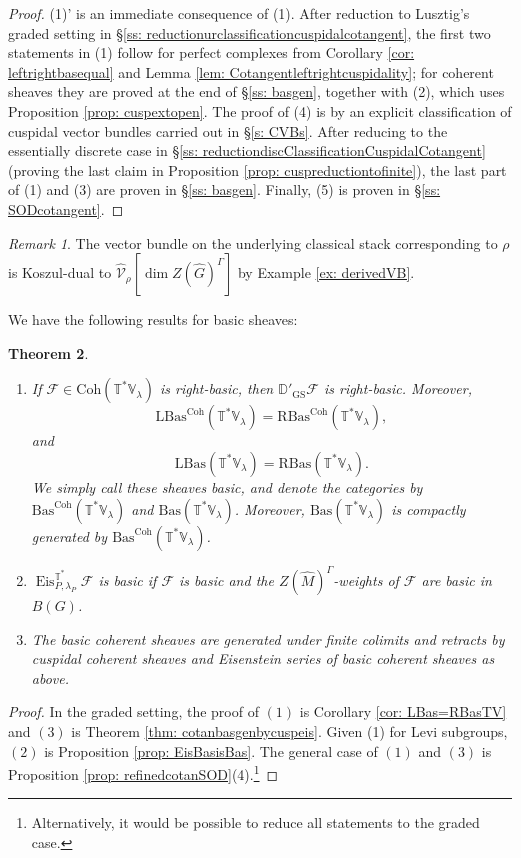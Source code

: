 \documentclass{amsart}
\newtheorem{theorem}{Theorem}[subsection]
\theoremstyle{definition}
\theoremstyle{remark}
\newtheorem{remark}[theorem]{Remark}
\numberwithin{equation}{section}
\newcommand{\mc}{\mathcal}
\newcommand{\wh}{\widehat}
\newcommand{\D}{\mathbb{D}}
\DeclareMathOperator{\Eis}{\mathrm{Eis}}
\newcommand{\Coh}{\mathrm{Coh}}
\newcommand{\GS}{\mathrm{GS}}
\newcommand{\V}{\mathbb{V}}
\newcommand{\T}{\mathbb{T}}
\newcommand{\RBas}{\mathrm{RBas}}
\newcommand{\LBas}{\mathrm{LBas}}
\newcommand{\Bas}{\mathrm{Bas}}
\begin{document}
\begin{proof}
    (1)' is an immediate consequence of (1). After reduction to Lusztig's graded setting in \S\ref{ss: reductionurclassificationcuspidalcotangent}, the first two statements in (1) follow for perfect complexes from Corollary \ref{cor: leftrightbasequal} and Lemma \ref{lem: Cotangentleftrightcuspidality}; for coherent sheaves they are proved at the end of \S \ref{ss: basgen}, together with (2), which uses Proposition \ref{prop: cuspextopen}. The proof of (4) is by an explicit classification of cuspidal vector bundles carried out in \S \ref{s: CVBs}. After reducing to the essentially discrete case in \S \ref{ss: reductiondiscClassificationCuspidalCotangent} (proving the last claim in Proposition \ref{prop: cuspreductiontofinite}), the last part of (1) and (3) are proven in \S \ref{ss: basgen}. Finally, (5) is proven in \S \ref{ss: SODcotangent}. 
\end{proof}

\begin{remark}
The vector bundle on the underlying classical stack corresponding to $\rho$ is Koszul-dual to $\wh{\mc V}_\rho [\dim Z(\wh G)^\Gamma]$ by Example \ref{ex: derivedVB}.  
\end{remark}

We have the following results for basic sheaves:

\begin{theorem}\label{thm: BasicCotangentMain}
\begin{enumerate}
    \item If $\mc F\in \Coh(\T^* \V_\lambda)$ is right-basic, then $\D'_{\GS}\mc F$ is right-basic. Moreover, 
    \[
    \LBas^{\Coh}(\T^*\V_\lambda)=\RBas^{\Coh}(\T^*\V_\lambda), 
    \]
    and
     \[
    \LBas(\T^*\V_\lambda)=\RBas(\T^*\V_\lambda). 
    \]
      We simply call these sheaves basic, and denote the categories by $\Bas^{\Coh}(\T^{\ast}\V_{\lambda})$ and $\Bas(\T^{\ast}\V_{\lambda})$. Moreover, $\Bas(\T^{\ast}\V_{\lambda})$ is compactly generated by $\Bas^{\Coh}(\T^{\ast}\V_{\lambda})$.
   
    \item $\Eis^{\T^*}_{P,\lambda_P}\mc F$ is basic if $\mc F$ is basic and the $Z(\wh M)^{\Gamma}$-weights of $\mc F$ are basic in $B(G)$. 
    \item The basic coherent sheaves are generated under finite colimits and retracts by cuspidal coherent sheaves and Eisenstein series of basic coherent sheaves as above. 
\end{enumerate}
\end{theorem}
\begin{proof}
In the graded setting, the proof of $(1)$ is Corollary \ref{cor: LBas=RBasTV} and $(3)$ is Theorem \ref{thm: cotanbasgenbycuspeis}. Given (1) for Levi subgroups, $(2)$ is Proposition \ref{prop: EisBasisBas}. The general case of $(1)$ and $(3)$ is Proposition \ref{prop: refinedcotanSOD}(4).\footnote{Alternatively, it would be possible to reduce all statements to the graded case.} 
\end{proof}
\end{document}
